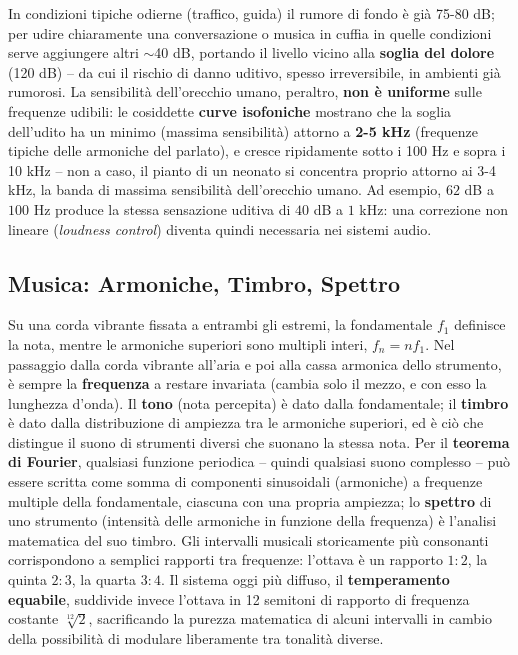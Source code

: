 \documentclass[a4paper,11pt]{article}
\begin{document}
In condizioni tipiche odierne (traffico, guida) il rumore di fondo è già 75-80 dB; per udire chiaramente una conversazione o musica in cuffia in quelle condizioni serve aggiungere altri $\sim$40 dB, portando il livello vicino alla \textbf{soglia del dolore} (120 dB) -- da cui il rischio di danno uditivo, spesso irreversibile, in ambienti già rumorosi. La sensibilità dell'orecchio umano, peraltro, \textbf{non è uniforme} sulle frequenze udibili: le cosiddette \textbf{curve isofoniche} mostrano che la soglia dell'udito ha un minimo (massima sensibilità) attorno a \textbf{2-5 kHz} (frequenze tipiche delle armoniche del parlato), e cresce ripidamente sotto i 100 Hz e sopra i 10 kHz -- non a caso, il pianto di un neonato si concentra proprio attorno ai 3-4 kHz, la banda di massima sensibilità dell'orecchio umano. Ad esempio, $62$ dB a $100$ Hz produce la stessa sensazione uditiva di $40$ dB a $1$ kHz: una correzione non lineare (\emph{loudness control}) diventa quindi necessaria nei sistemi audio.

\subsection{Musica: Armoniche, Timbro, Spettro}

Su una corda vibrante fissata a entrambi gli estremi, la fondamentale $f_1$ definisce la nota, mentre le armoniche superiori sono multipli interi, $f_n=nf_1$. Nel passaggio dalla corda vibrante all'aria e poi alla cassa armonica dello strumento, è sempre la \textbf{frequenza} a restare invariata (cambia solo il mezzo, e con esso la lunghezza d'onda). Il \textbf{tono} (nota percepita) è dato dalla fondamentale; il \textbf{timbro} è dato dalla distribuzione di ampiezza tra le armoniche superiori, ed è ciò che distingue il suono di strumenti diversi che suonano la stessa nota. Per il \textbf{teorema di Fourier}, qualsiasi funzione periodica -- quindi qualsiasi suono complesso -- può essere scritta come somma di componenti sinusoidali (armoniche) a frequenze multiple della fondamentale, ciascuna con una propria ampiezza; lo \textbf{spettro} di uno strumento (intensità delle armoniche in funzione della frequenza) è l'analisi matematica del suo timbro. Gli intervalli musicali storicamente più consonanti corrispondono a semplici rapporti tra frequenze: l'ottava è un rapporto $1{:}2$, la quinta $2{:}3$, la quarta $3{:}4$. Il sistema oggi più diffuso, il \textbf{temperamento equabile}, suddivide invece l'ottava in 12 semitoni di rapporto di frequenza costante $\sqrt[12]{2}$, sacrificando la purezza matematica di alcuni intervalli in cambio della possibilità di modulare liberamente tra tonalità diverse.
\end{document}
